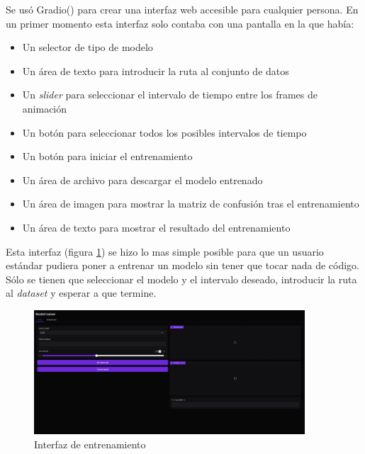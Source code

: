 Se usó Gradio(\cite{Abid_Gradio_Hassle-free_sharing_2019}) para crear una interfaz web accesible para cualquier persona. En un primer momento esta interfaz solo contaba con una pantalla en la que había:
\begin{itemize}
    \item Un selector de tipo de modelo
    \item Un área de texto para introducir la ruta al conjunto de datos
    \item Un \textit{slider} para seleccionar el intervalo de tiempo entre los frames de animación
    \item Un botón para seleccionar todos los posibles intervalos de tiempo
    \item Un botón para iniciar el entrenamiento
    \item Un área de archivo para descargar el modelo entrenado
    \item Un área de imagen para mostrar la matriz de confusión tras el entrenamiento
    \item Un área de texto para mostrar el resultado del entrenamiento
\end{itemize}

Esta interfaz (figura \ref{fig:interfaz-train}) se hizo lo mas simple posible para que un usuario estándar pudiera poner a entrenar un modelo sin tener que tocar nada de código. Sólo se tienen que seleccionar el modelo y el intervalo deseado, introducir la ruta al \textit{dataset} y esperar a que termine.
\begin{figure}[h!]
    \centering
    \includegraphics[width=0.9\textwidth]{Imagenes/Bitmap/interfaz-train.png}
    \caption{Interfaz de entrenamiento}
    \label{fig:interfaz-train}
\end{figure}


